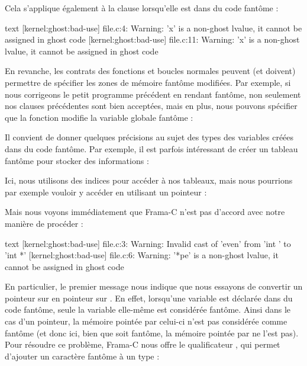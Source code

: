 Cela s'applique également à la clause  lorsqu'elle est dans
du code fantôme :




\begin{CodeBlock}{text}
[kernel:ghost:bad-use] file.c:4: Warning:
  'x' is a non-ghost lvalue, it cannot be assigned in ghost code
[kernel:ghost:bad-use] file.c:11: Warning:
  'x' is a non-ghost lvalue, it cannot be assigned in ghost code
\end{CodeBlock}


En revanche, les contrats des fonctions et boucles normales peuvent (et doivent)
permettre de spécifier les zones de mémoire fantôme modifiées. Par exemple, si
nous corrigeons le petit programme précédent en rendant  fantôme,
non seulement nos clauses  précédentes sont bien acceptées,
mais en plus, nous pouvons spécifier que la fonction  modifie
la variable globale fantôme  :






Il convient de donner quelques précisions au sujet des types des variables
créées dans du code fantôme. Par exemple, il est parfois intéressant de
créer un tableau fantôme pour stocker des informations :




Ici, nous utilisons des indices pour accéder à nos tableaux, mais nous pourrions
par exemple vouloir y accéder en utilisant un pointeur :




Mais nous voyons immédiatement que Frama-C n'est pas d'accord avec notre manière
de procéder :


\begin{CodeBlock}{text}
[kernel:ghost:bad-use] file.c:3: Warning:
  Invalid cast of 'even' from 'int \ghost *' to 'int *'
[kernel:ghost:bad-use] file.c:6: Warning:
  '*pe' is a non-ghost lvalue, it cannot be assigned in ghost code
\end{CodeBlock}


En particulier, le premier message nous indique que nous essayons de convertir
un pointeur sur  en pointeur sur
. En effet, lorsqu'une variable est déclarée dans du code fantôme,
seule la variable elle-même est considérée fantôme. Ainsi dans le cas d'un pointeur,
la mémoire pointée par celui-ci n'est pas considérée comme fantôme (et donc ici, bien
que  soit fantôme, la mémoire pointée par  ne l'est
pas). Pour résoudre ce problème, Frama-C nous offre le qualificateur
, qui permet d'ajouter un caractère fantôme
à un type :


